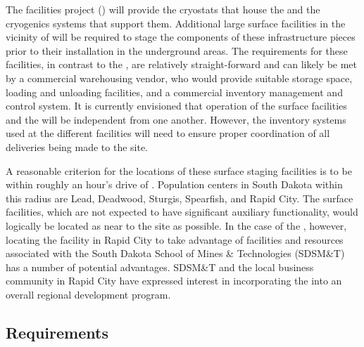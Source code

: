  The facilities project () will provide the cryostats that 
 house the  and the cryogenics
systems that support them.  Additional large surface facilities in the vicinity
of \surf will be required to stage the components of these
infrastructure pieces prior to their installation in the underground
areas.  The requirements for these facilities, in contrast to the
, are relatively straight-forward and can likely be met by
a commercial warehousing vendor, who would provide suitable storage
space, loading and unloading facilities, and a commercial inventory
management and control system.  It is currently envisioned that
operation of the  surface facilities and the 
 will be independent from one another.  However, the
inventory systems used at the different facilities will need to %
ensure proper coordination of all
deliveries being made to the \surf site.

A reasonable criterion for the locations of these surface staging
facilities is to be within roughly an hour's drive of \surf.
Population centers in South Dakota within this radius are Lead,
Deadwood, Sturgis, Spearfish, and Rapid City.  The 
surface facilities, which are not expected to have significant
auxiliary functionality, would logically be located as near to the
\surf site as possible.  In the case of the 
, however, locating the facility in Rapid City to take
advantage of facilities and resources associated with the South Dakota
School of Mines \& Technologies (SDSM\&T) has a number of potential
advantages.  SDSM\&T and the local business community in Rapid City
have expressed interest in incorporating the  
into an overall regional development program.

\subsection{Requirements}


